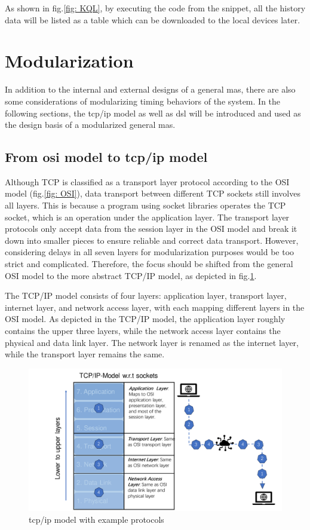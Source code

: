 As shown in fig.\ref{fig: KQL}, by executing the code from the snippet, all the history data will be listed as a table 
which can be downloaded to the local devices later. 


\section{Modularization}\label{chap: Meth-Modular}
In addition to the internal and external designs of a general \gls{mas}, 
there are also some considerations of modularizing timing behaviors of the 
system. In the following sections, the \gls{tcp/ip} model as well as 
\gls{dsl} will be introduced and used as the design basis of a modularized general 
\gls{mas}. 
\subsection{From \gls{osi} model to \gls{tcp/ip} model}

Although TCP is classified as a transport layer protocol according to the 
OSI model (fig.\ref{fig: OSI}), data transport between different TCP sockets 
still involves all layers. This is because a program using socket libraries 
operates the TCP socket, which is an operation under the application layer. 
The transport layer protocols only accept data from the session layer in the 
OSI model and break it down into smaller pieces to ensure reliable and correct 
data transport. However, considering delays in all seven layers for modularization 
purposes would be too strict and complicated. Therefore, the focus should be 
shifted from the general OSI model to the more abstract TCP/IP model, as depicted 
in fig.\ref{fig: TCP_IP}.

The TCP/IP model consists of four layers: application layer, transport layer, 
internet layer, and network access layer, with each mapping different layers in 
the OSI model. As depicted in the TCP/IP model, the application layer roughly 
contains the upper three layers, while the network access layer contains the 
physical and data link layer. The network layer is renamed as the internet 
layer, while the transport layer remains the same.

\begin{figure}[htb]
    \includegraphics[width=\textwidth]{figures/TCP_IP.pdf}
    
    \centering
    \caption{\gls{tcp/ip} model with example protocols \label{fig: TCP_IP}}
\end{figure}

